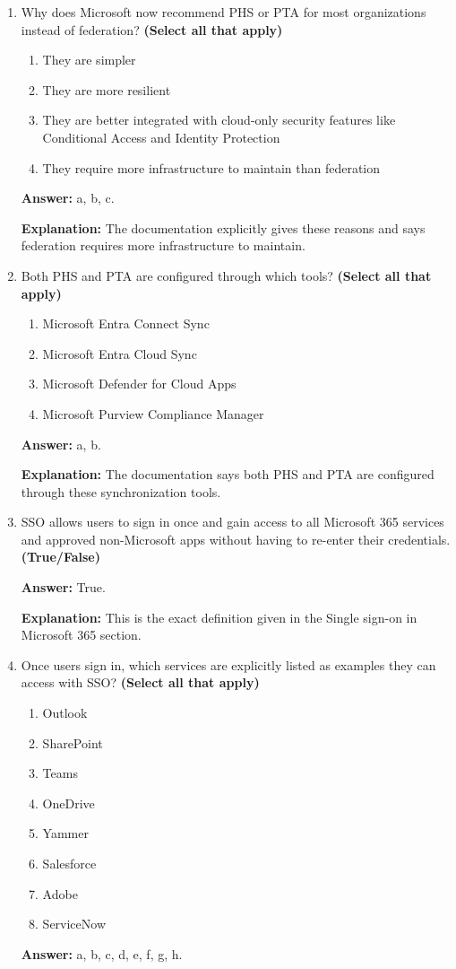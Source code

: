 \documentclass[10pt]{article}
\begin{document}
\begin{enumerate}[leftmargin=*]
\textbf{Explanation:} The documentation says federation redirects users to an on-premises federation server, which issues a trusted token.

\item Why does Microsoft now recommend PHS or PTA for most organizations instead of federation? \textbf{(Select all that apply)}
\begin{enumerate}[label=\alph*., leftmargin=1.5em]
\item They are simpler
\item They are more resilient
\item They are better integrated with cloud-only security features like Conditional Access and Identity Protection
\item They require more infrastructure to maintain than federation
\end{enumerate}
\textbf{Answer:} a, b, c.

\textbf{Explanation:} The documentation explicitly gives these reasons and says federation requires more infrastructure to maintain.

\item Both PHS and PTA are configured through which tools? \textbf{(Select all that apply)}
\begin{enumerate}[label=\alph*., leftmargin=1.5em]
\item Microsoft Entra Connect Sync
\item Microsoft Entra Cloud Sync
\item Microsoft Defender for Cloud Apps
\item Microsoft Purview Compliance Manager
\end{enumerate}
\textbf{Answer:} a, b.

\textbf{Explanation:} The documentation says both PHS and PTA are configured through these synchronization tools.

\item SSO allows users to sign in once and gain access to all Microsoft 365 services and approved non-Microsoft apps without having to re-enter their credentials. \textbf{(True/False)}

\textbf{Answer:} True.

\textbf{Explanation:} This is the exact definition given in the Single sign-on in Microsoft 365 section.

\item Once users sign in, which services are explicitly listed as examples they can access with SSO? \textbf{(Select all that apply)}
\begin{enumerate}[label=\alph*., leftmargin=1.5em]
\item Outlook
\item SharePoint
\item Teams
\item OneDrive
\item Yammer
\item Salesforce
\item Adobe
\item ServiceNow
\end{enumerate}
\textbf{Answer:} a, b, c, d, e, f, g, h.


\end{enumerate}
\end{document}
